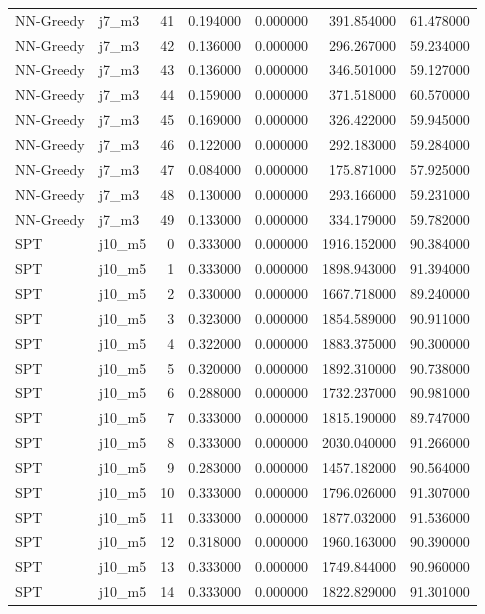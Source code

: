 \begin{tabular}{llrrrrr}
NN-Greedy & j7_m3 & 41 & 0.194000 & 0.000000 & 391.854000 & 61.478000 \\
NN-Greedy & j7_m3 & 42 & 0.136000 & 0.000000 & 296.267000 & 59.234000 \\
NN-Greedy & j7_m3 & 43 & 0.136000 & 0.000000 & 346.501000 & 59.127000 \\
NN-Greedy & j7_m3 & 44 & 0.159000 & 0.000000 & 371.518000 & 60.570000 \\
NN-Greedy & j7_m3 & 45 & 0.169000 & 0.000000 & 326.422000 & 59.945000 \\
NN-Greedy & j7_m3 & 46 & 0.122000 & 0.000000 & 292.183000 & 59.284000 \\
NN-Greedy & j7_m3 & 47 & 0.084000 & 0.000000 & 175.871000 & 57.925000 \\
NN-Greedy & j7_m3 & 48 & 0.130000 & 0.000000 & 293.166000 & 59.231000 \\
NN-Greedy & j7_m3 & 49 & 0.133000 & 0.000000 & 334.179000 & 59.782000 \\
SPT & j10_m5 & 0 & 0.333000 & 0.000000 & 1916.152000 & 90.384000 \\
SPT & j10_m5 & 1 & 0.333000 & 0.000000 & 1898.943000 & 91.394000 \\
SPT & j10_m5 & 2 & 0.330000 & 0.000000 & 1667.718000 & 89.240000 \\
SPT & j10_m5 & 3 & 0.323000 & 0.000000 & 1854.589000 & 90.911000 \\
SPT & j10_m5 & 4 & 0.322000 & 0.000000 & 1883.375000 & 90.300000 \\
SPT & j10_m5 & 5 & 0.320000 & 0.000000 & 1892.310000 & 90.738000 \\
SPT & j10_m5 & 6 & 0.288000 & 0.000000 & 1732.237000 & 90.981000 \\
SPT & j10_m5 & 7 & 0.333000 & 0.000000 & 1815.190000 & 89.747000 \\
SPT & j10_m5 & 8 & 0.333000 & 0.000000 & 2030.040000 & 91.266000 \\
SPT & j10_m5 & 9 & 0.283000 & 0.000000 & 1457.182000 & 90.564000 \\
SPT & j10_m5 & 10 & 0.333000 & 0.000000 & 1796.026000 & 91.307000 \\
SPT & j10_m5 & 11 & 0.333000 & 0.000000 & 1877.032000 & 91.536000 \\
SPT & j10_m5 & 12 & 0.318000 & 0.000000 & 1960.163000 & 90.390000 \\
SPT & j10_m5 & 13 & 0.333000 & 0.000000 & 1749.844000 & 90.960000 \\
SPT & j10_m5 & 14 & 0.333000 & 0.000000 & 1822.829000 & 91.301000 \\

\end{tabular}
